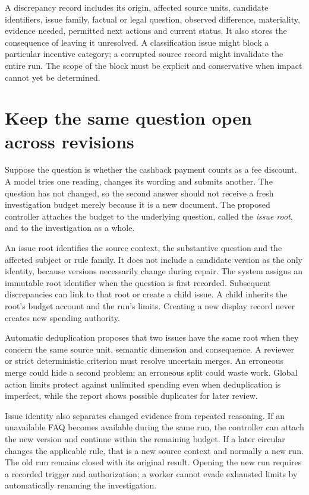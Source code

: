 A discrepancy record includes its origin, affected source units, candidate
identifiers, issue family, factual or legal question, observed difference,
materiality, evidence needed, permitted next actions and current status. It also
stores the consequence of leaving it unresolved. A classification issue might
block a particular incentive category; a corrupted source record might invalidate
the entire run. The scope of the block must be explicit and conservative when
impact cannot yet be determined.

\section{Keep the same question open across revisions}
\label{merge:M06:06}


Suppose the question is whether the cashback payment counts as a fee discount.
A model tries one reading, changes its wording and submits another. The question
has not changed, so the second answer should not receive a fresh investigation
budget merely because it is a new document. The proposed controller attaches
the budget to the underlying question, called the \emph{issue root}, and to the
investigation as a whole.

An issue root identifies the source context, the substantive question and the
affected subject or rule family. It does not include a candidate version as the only
identity, because versions necessarily change during repair. The system
assigns an immutable root identifier when the question is first recorded.
Subsequent discrepancies can link to that root or create a child issue. A child
inherits the root's budget account and the run's limits. Creating a new display
record never creates new spending authority.


Automatic deduplication proposes that two issues have the same root when they
concern the same source unit, semantic dimension and consequence. A reviewer or
strict deterministic criterion must resolve uncertain merges. An erroneous merge
could hide a second problem; an erroneous split could waste work. Global action
limits protect against unlimited spending even when deduplication is imperfect,
while the report shows possible duplicates for later review.

Issue identity also separates changed evidence from repeated reasoning. If an
unavailable FAQ becomes available during the same run, the controller can attach
the new version and continue within the remaining budget. If a later circular
changes the applicable rule, that is a new source context and normally a new run.
The old run remains closed with its original result. Opening the new run requires
a recorded trigger and authorization; a worker cannot evade exhausted limits by
automatically renaming the investigation.

